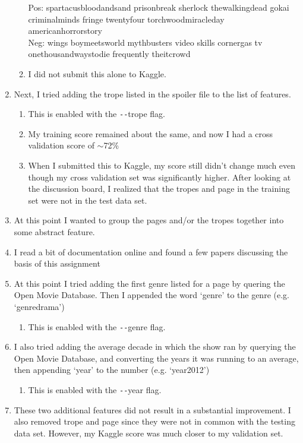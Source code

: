 \documentclass[8pt]{extarticle}
\begin{document}
\begin{enumerate}
\begin{enumerate}
      Pos: spartacusbloodandsand prisonbreak sherlock thewalkingdead gokai criminalminds fringe twentyfour torchwoodmiracleday americanhorrorstory\\
      Neg: wings boymeetsworld mythbusters video skills cornergas tv onethousandwaystodie frequently theitcrowd
    \item I did not submit this alone to Kaggle.
  \end{enumerate}
  \item Next, I tried adding the trope listed in the spoiler file to the list of features.
  \begin{enumerate}
    \item This is enabled with the \texttt{-{}-}trope flag.
    \item My training score remained about the same, and now I had a cross validation score of $\sim$72\%
    \item When I submitted this to Kaggle, my score still didn't change much even though my cross validation set was significantly higher.  After looking at the discussion board, I realized that the tropes and page in the training set were not in the test data set.
  \end{enumerate}
  \item At this point I wanted to group the pages and/or the tropes together into some abstract feature.
  \item I read a bit of documentation online and found a few papers discussing the basis of this assignment \cite{spoilerAlertPaper1} \cite{spoilerAlertPaper2}
  \item At this point I tried adding the first genre listed for a page by quering the Open Movie Database.  Then I appended the word `genre' to the genre (e.g. `genredrama')
  \begin{enumerate}
    \item This is enabled with the \texttt{-{}-}genre flag.
  \end{enumerate}
  \item I also tried adding the average decade in which the show ran by querying the Open Movie Database, and converting the years it was running to an average, then appending `year' to the number (e.g. `year2012')
  \begin{enumerate}
    \item This is enabled with the \texttt{-{}-}year flag.
  \end{enumerate}
  \item These two additional features did not result in a substantial improvement.  I also removed trope and page since they were not in common with the testing data set.  However, my Kaggle score was much closer to my validation set.

\end{enumerate}
\end{document}
